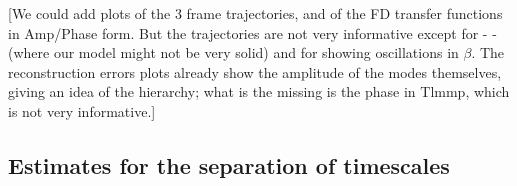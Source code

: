 \documentclass[aps,showpacs,twocolumn,
prd,superscriptaddress,nofootinbib]{revtex4-1}
\newcommand\calT{{\mathcal{T}}}
\newcommand{\SM}[1]{{\color{Red} #1}}
\begin{document}

\SM{[We could add plots of the 3 frame trajectories, and of the FD transfer functions in Amp/Phase form. But the trajectories are not very informative except for - - (where our model might not be very solid) and for showing oscillations in $\beta$. The reconstruction errors plots already show the amplitude of the modes themselves, giving an idea of the hierarchy; what is the missing is the phase in Tlmmp, which is not very informative.]}



\subsection{Estimates for the separation of timescales}
\label{subsec:sizecorrPrec}
\end{document}
